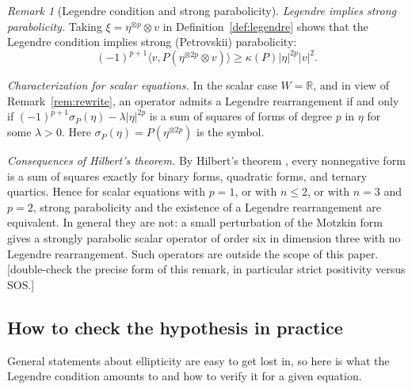 \documentclass[11pt,reqno]{amsart}
\theoremstyle{definition}
\theoremstyle{remark}
\newtheorem{remark}[theorem]{Remark}
\newcommand{\R}{\mathbb{R}}
\newcommand{\ip}[2]{\langle #1,#2\rangle}
\newcommand{\abs}[1]{\lvert #1\rvert}
\newcommand{\todo}[1]{\textcolor{red!70!black}{[#1]}}
\numberwithin{equation}{section}
\begin{document}
\begin{remark}[Legendre condition and strong parabolicity]\label{rem:sos}
\emph{Legendre implies strong parabolicity.} Taking $\xi=\eta^{\otimes p}\otimes v$ in
Definition~\ref{def:legendre} shows that the Legendre condition implies strong (Petrovskii)
parabolicity:
\[
  (-1)^{p+1}\ip{v}{P(\eta^{\otimes 2p}\otimes v)}\ge\kappa(P)\abs{\eta}^{2p}\abs{v}^2 .
\]

\emph{Characterization for scalar equations.} In the scalar case $W=\R$, and in view of
Remark~\ref{rem:rewrite}, an operator admits a Legendre rearrangement if and only if
$(-1)^{p+1}\sigma_P(\eta)-\lambda\abs\eta^{2p}$ is a sum of squares of forms of degree $p$ in $\eta$
for some $\lambda>0$. Here $\sigma_P(\eta)=P(\eta^{\otimes2p})$ is the symbol.

\emph{Consequences of Hilbert's theorem.} By Hilbert's theorem \cite{Hilbert}, every nonnegative form
is a sum of squares exactly for binary forms, quadratic forms, and ternary quartics. Hence for scalar
equations with $p=1$, or with $n\le2$, or with $n=3$ and $p=2$, strong parabolicity and the existence
of a Legendre rearrangement are equivalent. In general they are not: a small perturbation of the
Motzkin form \cite{Motzkin} gives a strongly parabolic scalar operator of order six in dimension
three with no Legendre rearrangement. Such operators are outside the scope of this paper.
\todo{double-check the precise form of this remark, in particular strict positivity versus SOS.}
\end{remark}

\subsection{How to check the hypothesis in practice}\label{sec:howto}

General statements about ellipticity are easy to get lost in, so here is what the Legendre condition
amounts to and how to verify it for a given equation.
\end{document}
